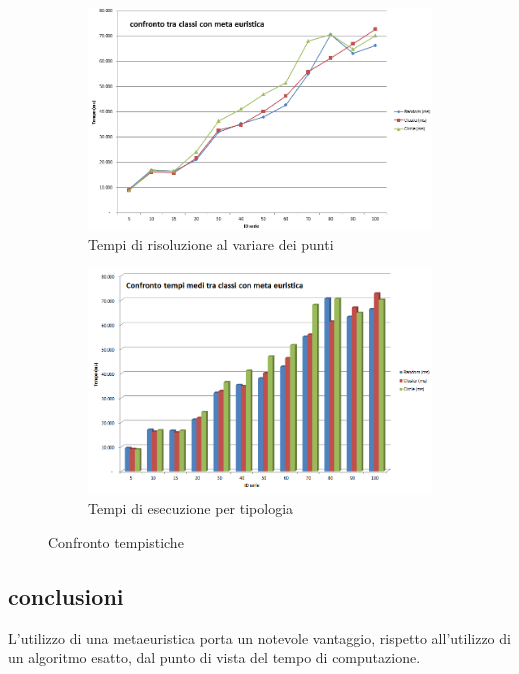 \begin{figure}
\centering
\begin{subfigure}[b]{0.9\textwidth}
\includegraphics[width=\textwidth]{Images/Part_2/graphics/Times01.png}
\caption{Tempi di risoluzione al variare dei punti}
\label{pt2:time:time01}
\end{subfigure}

\begin{subfigure}[b]{0.9\textwidth}
\includegraphics[width=\textwidth]{Images/Part_2/graphics/Times02.png}
\caption{Tempi di esecuzione per tipologia}
\label{pt2:time:time02}
\end{subfigure}
\caption{Confronto tempistiche}
\label{pt1:time:times}
\end{figure}

\subsection[Conclusioni]{conclusioni}
\label{pt2:time:conclusion}
L'utilizzo di una metaeuristica porta un notevole vantaggio, rispetto all'utilizzo di un algoritmo esatto, dal punto di vista del tempo di computazione.

